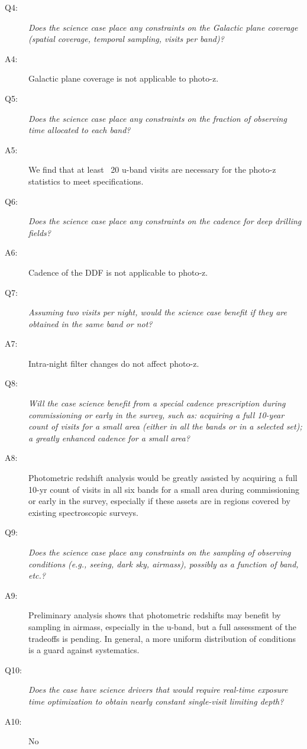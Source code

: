 \begin{description}
 \item[Q4:] {\it Does the science case place any constraints on the
 Galactic plane coverage (spatial coverage, temporal sampling, visits per
 band)?}

 \item[A4:] Galactic plane coverage is not applicable to photo-z.

 \item[Q5:] {\it Does the science case place any constraints on the
 fraction of observing time allocated to each band?}

 \item[A5:] We find that at least ~20 u-band visits are necessary for the photo-z statistics to meet specifications.

 \item[Q6:] {\it Does the science case place any constraints on the
 cadence for deep drilling fields?}

 \item[A6:] Cadence of the DDF is not applicable to photo-z.

 \item[Q7:] {\it Assuming two visits per night, would the science case
 benefit if they are obtained in the same band or not?}

 \item[A7:] Intra-night filter changes do not affect photo-z.

 \item[Q8:] {\it Will the case science benefit from a special cadence
 prescription during commissioning or early in the survey, such as:
 acquiring a full 10-year count of visits for a small area (either in all
 the bands or in a  selected set); a greatly enhanced cadence for a small
 area?}

 \item[A8:] Photometric redshift analysis would be greatly assisted by acquiring a full 10-yr count of visits in all six bands for a small area during commissioning or early in the survey, especially if these assets are in regions covered by existing spectroscopic surveys.

 \item[Q9:] {\it Does the science case place any constraints on the
 sampling of observing conditions (e.g., seeing, dark sky, airmass),
 possibly as a function of band, etc.?}

 \item[A9:] Preliminary analysis shows that photometric redshifts may benefit by sampling in airmass, especially in the u-band, but a full assessment of the tradeoffs is pending. In general, a more uniform distribution of conditions is a guard against systematics.

 \item[Q10:] {\it Does the case have science drivers that would require
 real-time exposure time optimization to obtain nearly constant
 single-visit limiting depth?}

 \item[A10:] No

 \end{description}


\navigationbar


